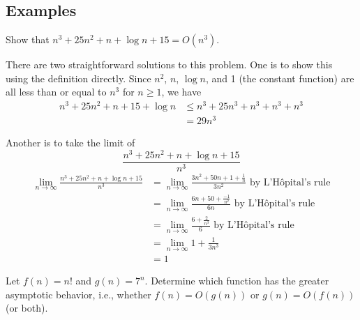 \subsection{Examples}
\begin{exercise}{}{}
    Show that $n^3+25n^2+n+\log{n}+15=O(n^3)$.
\end{exercise}

\begin{solution}
    There are two straightforward solutions to this problem. One is to show this using the \bigOName definition directly. Since $n^2$, $n$, $\log{n}$, and 1 (the constant function) are all less than or equal to $n^3$ for $n\geq1$, we have
    \begin{align*}
        n^3+25n^2+n+15+\log{n} & \leq n^3+25n^3+n^3+n^3+n^3 \\&=29n^3
    \end{align*}

    Another is to take the limit of \[\frac{n^3+25n^2+n+\log{n}+15}{n^3}\]
    \begin{align*}
        \lim_{n\to\infty}\frac{n^3+25n^2+n+\log{n}+15}{n^3}
         & =\lim_{n\to\infty}\frac{3n^2+50n+1+\frac{1}{n}}{3n^2}\text{ by L'H\^{o}pital's rule} \\
         & =\lim_{n\to\infty}\frac{6n+50+\frac{-1}{n^2}}{6n}\text{ by L'H\^{o}pital's rule}     \\
         & =\lim_{n\to\infty}\frac{6+\frac{2}{n^3}}{6}\text{ by L'H\^{o}pital's rule}           \\
         & =\lim_{n\to\infty}1+\frac{1}{3n^3}                                                   \\
         & =1
    \end{align*}

\end{solution}

\begin{exercise}{}{}
    Let $f(n)=n!$ and $g(n)=7^n$. Determine which function has the greater asymptotic behavior, i.e., whether $f(n)=O(g(n))$ or $g(n)=O(f(n))$ (or both).
\end{exercise}

